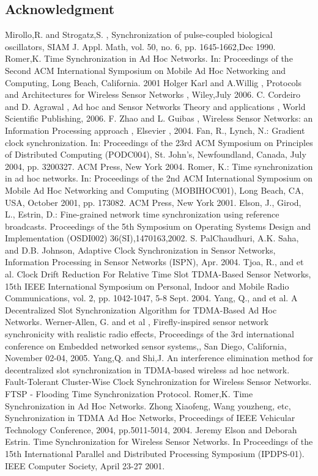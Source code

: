 \documentclass[a4paper,8pt]{report}
\begin{document}
\subsection*{Acknowledgment}
\newpage
\begin{thebibliography}{References}
 Mirollo,R. and Strogatz,S. , Synchronization of pulse-coupled biological oscillators, SIAM J. Appl. Math, vol. 50, no. 6, pp. 1645-1662,Dec 1990.
 Romer,K. Time Synchronization in Ad Hoc Networks. In: Proceedings of the Second ACM International Symposium on Mobile Ad Hoc Networking and Computing, Long Beach, California. 2001
 Holger Karl and A.Willig , Protocols and Architectures for Wireless Sensor Networks , Wiley,July 2006.
 C. Cordeiro and D. Agrawal , Ad hoc and Sensor Networks Theory and applications , World Scientific Publishing, 2006.
 F. Zhao and L. Guibas , Wireless Sensor Networks: an Information Processing approach , Elsevier , 2004.
 Fan, R., Lynch, N.: Gradient clock synchronization. In: Proceedings of the 23rd ACM Symposium on Principles of Distributed Computing (PODC004),
St. John's, Newfoundland, Canada, July 2004, pp. 3200327. ACM Press,
New York 2004.
Romer, K.: Time synchronization in ad hoc networks. In: Proceedings of the 2nd ACM International Symposium on Mobile Ad Hoc Networking and
Computing (MOBIHOC001), Long Beach, CA, USA, October 2001, pp.
173082. ACM Press, New York 2001.
 Elson, J., Girod, L., Estrin, D.: Fine-grained network time synchronization using reference broadcasts. Proceedings of the 5th Symposium on
Operating Systems Design and Implementation (OSDI002)
36(SI),1470163,2002.
 S. PalChaudhuri, A.K. Saha, and D.B. Johnson, Adaptive Clock Synchronization in Sensor Networks, Information Processing in Sensor Networks (ISPN), Apr. 2004.
Tjoa, R., and et al. Clock Drift Reduction For Relative Time Slot TDMA-Based Sensor Networks, 15th IEEE International Symposium on Personal, Indoor and
Mobile Radio Communications, vol. 2, pp. 1042-1047, 5-8 Sept. 2004.
 Yang, Q., and et al. A Decentralized Slot Synchronization Algorithm for TDMA-Based Ad Hoc
Networks.
 Werner-Allen, G. and et al , Firefly-inspired sensor network synchronicity with realistic radio effects, Proceedings of the 3rd international
conference on Embedded networked sensor systems,, San Diego,
California, November 02-04, 2005.
 Yang,Q. and Shi,J. An interference elimination method for decentralized slot synchronization in TDMA-based wireless ad hoc network.
 Fault-Tolerant Cluster-Wise Clock Synchronization for Wireless Sensor Networks.
 FTSP - Flooding Time Synchronization Protocol.
 Romer,K. Time Synchronization in Ad Hoc Networks.
 Zhong Xiaofeng, Wang youzheng, etc, Synchronization in TDMA Ad Hoc Networks, Proceedings of IEEE Vehicular Technology Conference, 2004, pp.5011-5014, 2004.
 Jeremy Elson and Deborah Estrin. Time Synchronization for Wireless Sensor Networks. In Proceedings of the 15th International
Parallel and Distributed Processing Symposium (IPDPS-01). IEEE
Computer Society, April 23-27 2001.
\end{thebibliography}
\appendix
\end{document}
